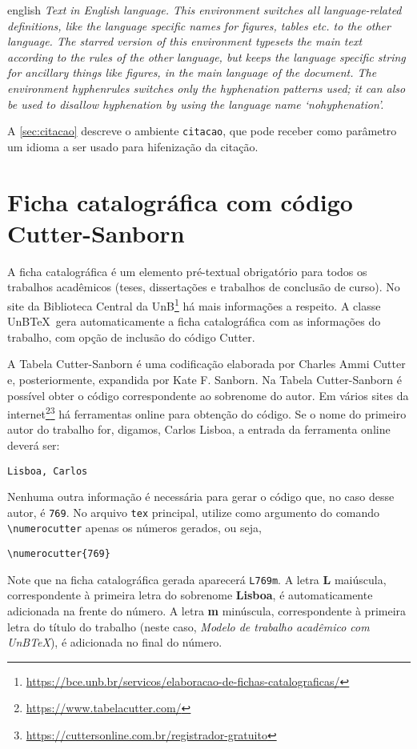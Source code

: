 \begin{otherlanguage*}{english}
\textit{Text in English language. This environment switches all language-related definitions, like the language specific names for figures, tables etc. to the other language. The starred version of this environment typesets the main text according to the rules of the other language, but keeps the language specific string for ancillary things like figures, in the main language of the document. The environment hyphenrules switches only the hyphenation patterns used; it can also be used to disallow hyphenation by using the language name `nohyphenation'.}
\end{otherlanguage*}

A \cref{sec:citacao} descreve o ambiente \texttt{citacao}, que pode receber como parâmetro um idioma a ser usado para hifenização da citação.

\section{Ficha catalográfica com código Cutter-Sanborn}

A ficha catalográfica é um elemento pré-textual obrigatório para todos os trabalhos acadêmicos (teses, dissertações e trabalhos de conclusão de curso). No site da Biblioteca Central da UnB\footnote{\url{https://bce.unb.br/servicos/elaboracao-de-fichas-catalograficas/}} há mais informações a respeito. A classe UnB\TeX\ gera automaticamente a ficha catalográfica com as informações do trabalho, com opção de inclusão do código Cutter.

A Tabela Cutter-Sanborn é uma codificação elaborada por Charles Ammi Cutter e, posteriormente, expandida por Kate F. Sanborn. Na Tabela Cutter-Sanborn é possível obter o código correspondente ao sobrenome do autor. Em vários sites da internet\footnote{\url{https://www.tabelacutter.com/}}\footnote{\url{https://cuttersonline.com.br/registrador-gratuito}} há ferramentas online para obtenção do código. Se o nome do primeiro autor do trabalho for, digamos, Carlos Lisboa, a entrada da ferramenta online deverá ser: 
\begin{verbatim}
Lisboa, Carlos
\end{verbatim}
Nenhuma outra informação é necessária para gerar o código que, no caso desse autor, é \texttt{769}. No arquivo \texttt{tex} principal, utilize como argumento do comando \verb|\numerocutter| apenas os números gerados, ou seja,
\begin{verbatim}
\numerocutter{769}
\end{verbatim}
Note que na ficha catalográfica gerada aparecerá \texttt{L769m}. A letra \textbf{L} maiúscula, correspondente à primeira letra do sobrenome \textbf{Lisboa}, é automaticamente adicionada na frente do número. A letra \textbf{m} minúscula, correspondente à primeira letra do título do trabalho (neste caso, \emph{Modelo de trabalho acadêmico com UnB\TeX}), é adicionada no final do número.

